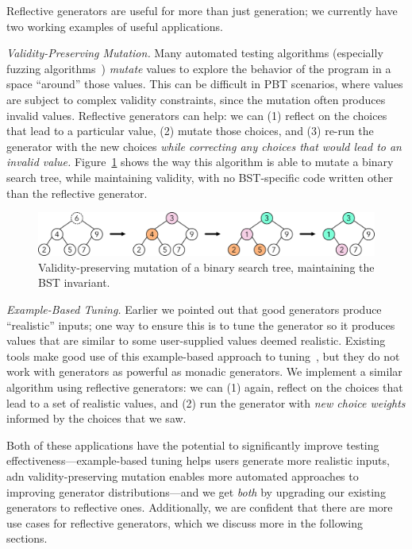 Reflective generators are useful for more than just generation; we currently
have two working examples of useful applications.

{\em Validity-Preserving Mutation.} Many automated testing algorithms
(especially fuzzing algorithms~\cite{afl-readme}) {\em mutate} values to explore
the behavior of the program in a space ``around'' those values. This can be
difficult in PBT scenarios, where values are subject to complex validity
constraints, since the mutation often produces invalid values. Reflective
generators can help: we can (1) reflect on the choices that lead to a particular
value, (2) mutate those choices, and (3) re-run the generator with the new
choices {\em while correcting any choices that
would lead to an invalid value.} Figure~\ref{fig:mutation} shows the way this
algorithm is able to mutate a binary search tree, while maintaining validity,
with no BST-specific code written other than the reflective generator.

\begin{figure}[h]
  \centering
  \includegraphics[width=.6\textwidth]{assets/mutate-diagram.pdf}
  \caption{Validity-preserving mutation of a binary search tree, maintaining the
  BST invariant.}\label{fig:mutation}
\end{figure}

{\em Example-Based Tuning.} Earlier we pointed out that good generators
produce ``realistic'' inputs; one way to ensure this is to tune the generator so
it produces values that are similar to some user-supplied values deemed
realistic. Existing tools make good use of this example-based approach to
tuning~\cite{soremekun2020inputs}, but they do not work with generators as
powerful as monadic generators. We implement a similar algorithm using
reflective generators: we can (1) again, reflect on the choices that lead to a
set of realistic values, and (2) run the generator with {\em new choice weights}
informed by the choices that we saw.

Both of these applications have the potential to significantly improve testing
effectiveness---example-based tuning helps users generate more realistic inputs,
adn validity-preserving mutation enables more automated approaches to improving
generator distributions---and we get {\em both} by upgrading our existing
generators to reflective ones. Additionally, we are confident that there are
more use cases for reflective generators, which we discuss more in the following
sections.

